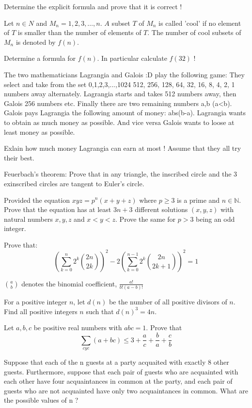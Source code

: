 Determine the explicit formula and prove that it is correct !
\eq

\bq{}{}
Let $n \in N$ and $M_n = {1, 2, 3, \ldots, n}$. $A$ subset $T$ of $M_n$ is called 'cool' if no element of $T$ is smaller than the number of elements of $T$. The number of cool subsets of $M_n$ is denoted by $f(n)$.

Determine a formula for $f(n)$. In particular calculate $f(32)$ !
\eq

\bq{}{}
The two mathematicians Lagrangia and Galois :D play the following game:
They select and take from the set {0,1,2,3,...,1024} 512, 256, 128, 64, 32, 16, 8, 4, 2, 1 numbers away alternately. Lagrangia starts and takes 512 numbers away, then Galois 256 numbers etc. Finally there are two remaining numbers a,b (a<b). Galois pays Lagrangia the following amount of money: abs(b-a).
Lagrangia wants to obtain as much money as possible. And vice versa Galois wants to loose at least money as possible.

Exlain how much money Lagrangia can earn at most ! Assume that they all try their best.
\eq

\bq{}{}
Feuerbach's theorem:
Prove that in any triangle, the inscribed circle and the 3 exinscribed circles are tangent to Euler's circle.
\eq

Provided the equation $xyz = p^n(x + y + z)$ where $p \geq 3$ is a prime and $n \in \mathbb{N}$. Prove that the equation has at least $3n + 3$ different solutions $(x,y,z)$ with natural numbers $x,y,z$ and $x < y < z$. Prove the same for $p > 3$ being an odd integer.
\eq

\bq{}{}
Prove that: \[ \left(\sum_{k=0}^{n} 2^k \binom{2n}{2k}\right)^2 - 2 \left(\sum_{k=0}^{n-1} 2^k \binom{2n}{2k+1}\right)^2=1 \]

$\binom{a}{b}$ denotes the binomial coefficient, $\frac{a!}{b!(a-b)!}$
\eq

For a positive integer $n$, let $d(n)$ be the number of all positive divisors of $n$. Find all positive integers $n$ such that $d(n)^3=4n$.
\eq

\bq{}{}
Let $a, b, c$ be positive real numbers with $abc = 1$. Prove that
\[\sum_{cyc} (a+ bc) \leq 3 + \frac{a}c+\frac{b}a+\frac{c}b\]
\eq

\bq{}{}
Suppose that each of the n guests at a party acquaited with exactly 8 other guests. Furthermore, suppose that each pair of guests who are acquainted with each other have four acquaintances in common at the party, and each pair of guests who are not acquainted have only two acquaintances in common. What are the possible values of n ?
\eq

